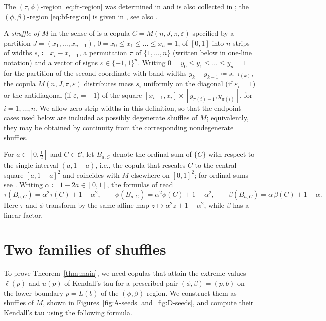 \documentclass{article}
\newcommand{\C}{\mathcal{C}}
\newcommand{\I}{[0,1]}
\begin{document}
The $(\tau,\phi)$-region \eqref{eq:ft-region} was determined in \cite[Thm.~4]{kokolbukovsek2023exact} and is also collected in \cite[Prop.~2.1]{kokolbukovsek2026footrule}; the $(\phi,\beta)$-region \eqref{eq:bf-region} is given in \cite[Thm.~11]{kokolbukovsek2021spearman}, see also \cite[Thm.~7]{kokolbukovsek2019relation}.

A \emph{shuffle of $M$} in the sense of \cite{mikusinski1992shuffles} is a copula $C=M(n,J,\pi,\varepsilon)$ specified by a partition $J=(x_1,\dots,x_{n-1})$, $0=x_0\le x_1\le\dots\le x_n=1$, of $\I$ into $n$ strips of widths $s_i\coloneqq x_i-x_{i-1}$, a permutation $\pi$ of $\{1,\dots,n\}$ (written below in one-line notation) and a vector of signs $\varepsilon\in\{-1,1\}^n$.
Writing $0=y_0\le y_1\le\dots\le y_n=1$ for the partition of the second coordinate with band widths $y_k-y_{k-1}\coloneqq s_{\pi^{-1}(k)}$, the copula $M(n,J,\pi,\varepsilon)$ distributes mass $s_i$ uniformly on the diagonal (if $\varepsilon_i=1$) or the antidiagonal (if $\varepsilon_i=-1$) of the square $[x_{i-1},x_i]\times[y_{\pi(i)-1},y_{\pi(i)}]$, for $i=1,\dots,n$.
We allow zero strip widths in this definition, so that the endpoint cases used below are included as possibly degenerate shuffles of $M$; equivalently, they may be obtained by continuity from the corresponding nondegenerate shuffles.

For $a\in[0,\frac12]$ and $C\in\C$, let $B_{a,C}$ denote the ordinal sum of $\{C\}$ with respect to the single interval $(a,1-a)$, i.e., the copula that rescales $C$ to the central square $[a,1-a]^2$ and coincides with $M$ elsewhere on $\I^2$; for ordinal sums see \cite[Sec.~3.2.2]{nelsen2006introduction}.
Writing $\alpha\coloneqq 1-2a\in[0,1]$, the formulas of \cite[Lem.~3.8]{kokolbukovsek2026footrule} read
\begin{equation}\label{eq:ordinal-sum}
\tau(B_{a,C})=\alpha^2\tau(C)+1-\alpha^2,\qquad
\phi(B_{a,C})=\alpha^2\phi(C)+1-\alpha^2,\qquad
\beta(B_{a,C})=\alpha\,\beta(C)+1-\alpha.
\end{equation}
Here $\tau$ and $\phi$ transform by the same affine map $z\mapsto\alpha^2z+1-\alpha^2$, while $\beta$ has a linear factor.

\section{Two families of shuffles}\label{sec:seeds}

To prove Theorem~\ref{thm:main}, we need copulas that attain the extreme values $\ell(p)$ and $u(p)$ of Kendall's tau for a prescribed pair $(\phi,\beta)=(p,b)$ on the lower boundary $p=L(b)$ of the $(\phi,\beta)$-region.
We construct them as shuffles of $M$, shown in Figures~\ref{fig:A-seeds} and~\ref{fig:D-seeds}, and compute their Kendall's tau using the following formula.
\end{document}
